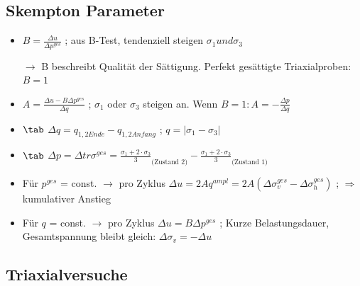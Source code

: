 \documentclass[fleqn,twoside]{article}
\newcommand{\abs}[1]{\ensuremath{\left\vert#1\right\vert}}
\begin{document}
\subsection{Skempton Parameter}

\begin{itemize}
	\item $B = \frac{\Delta u}{\Delta p^{ges}}$ ; aus B-Test, tendenziell steigen $\sigma_1 und \sigma_3$
	\item[$\rightarrow$] B beschreibt Qualität der Sättigung. Perfekt gesättigte Triaxialproben: $B = 1$
	\item $A  = \frac{\Delta u - B \Delta p^{ges}}{\Delta q}$ ; $\sigma_1$ oder $\sigma_3$ steigen an. Wenn $B=1: A=-\frac{\Delta p}{\Delta q}$
	\item $\tab$ $\Delta q = q_{1,2 Ende}-q_{1,2 Anfang}$ ; $q=\abs{\sigma_1 - \sigma_3}$
	\item $\tab$ $\Delta p=\Delta tr\sigma^{ges} = \frac{\sigma_1 +2\cdot \sigma_3}{3}_{\text{(Zustand 2)}} - \frac{\sigma_1 +2\cdot \sigma_3}{3}_{\text{(Zustand 1)}} $
	\item Für $p^{ges}$ = const. $\rightarrow$ pro Zyklus $\Delta u=2Aq^{ampl} = 2A(\Delta \sigma^{ges}_v - \Delta \sigma^{ges}_h)$ ; $\Rightarrow$ kumulativer Anstieg
	\item Für $q$ = const. $\rightarrow$ pro Zyklus $\Delta u=B\Delta p^{ges}$ ; Kurze Belastungsdauer, Gesamtspannung bleibt gleich: $\Delta \sigma_v = -\Delta u$
\end{itemize}

\subsection{Triaxialversuche}
\end{document}
